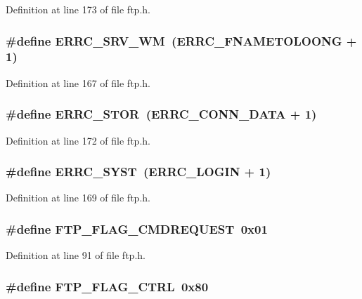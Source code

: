 Definition at line 173 of file ftp.h.

\hypertarget{group__ftp_ga2b8131ed927cfb34404a8b123ad33e1a}{
\subsubsection[{ERRC\_\-SRV\_\-WM}]{\setlength{\rightskip}{0pt plus 5cm}\#define ERRC\_\-SRV\_\-WM~(ERRC\_\-FNAMETOLOONG + 1)}}
\label{group__ftp_ga2b8131ed927cfb34404a8b123ad33e1a}


Definition at line 167 of file ftp.h.

\hypertarget{group__ftp_gae63f2981f55f40322da00aa03fce1472}{
\subsubsection[{ERRC\_\-STOR}]{\setlength{\rightskip}{0pt plus 5cm}\#define ERRC\_\-STOR~(ERRC\_\-CONN\_\-DATA + 1)}}
\label{group__ftp_gae63f2981f55f40322da00aa03fce1472}


Definition at line 172 of file ftp.h.

\hypertarget{group__ftp_ga2cee1778ee6192399bd5196d8abb81dd}{
\subsubsection[{ERRC\_\-SYST}]{\setlength{\rightskip}{0pt plus 5cm}\#define ERRC\_\-SYST~(ERRC\_\-LOGIN + 1)}}
\label{group__ftp_ga2cee1778ee6192399bd5196d8abb81dd}


Definition at line 169 of file ftp.h.

\hypertarget{group__ftp_ga39836d3275006cfefb6440e2a0183422}{
\subsubsection[{FTP\_\-FLAG\_\-CMDREQUEST}]{\setlength{\rightskip}{0pt plus 5cm}\#define FTP\_\-FLAG\_\-CMDREQUEST~0x01}}
\label{group__ftp_ga39836d3275006cfefb6440e2a0183422}


Definition at line 91 of file ftp.h.

\hypertarget{group__ftp_ga6b402e3086d470f0345f690cda06e37e}{
\subsubsection[{FTP\_\-FLAG\_\-CTRL}]{\setlength{\rightskip}{0pt plus 5cm}\#define FTP\_\-FLAG\_\-CTRL~0x80}}
\label{group__ftp_ga6b402e3086d470f0345f690cda06e37e}


